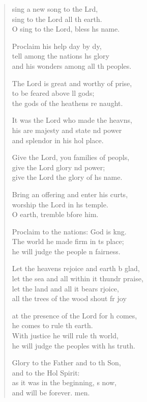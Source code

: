 \begin{verse}
  \begin{patverse}
 sing a new song to the Lrd,\Flex\\
sing to the Lord all th earth.\Med\\
O sing to the Lord, bless h\pointup{\i}s name.

Proclaim his help day by dy,\Flex\\
tell among the nations h\pointup{\i}s glory\Med\\
and his wonders among all th peoples.

The Lord is great and worthy of prise,\Flex\\
to be feared above ll gods;\Med\\
the gods of the heathens re naught.

It was the Lord who made the heavns,\Flex\\
his are majesty and state nd power\Med\\
and splendor in his hol place.

Give the Lord, you families of peopls,\Flex\\
give the Lord glory nd power;\Med\\
give the Lord the glory of h\pointup{\i}s name.

Bring an offering and enter his curts,\Flex\\
worship the Lord in h\pointup{\i}s temple.\Med\\
O earth, tremble bfore him.

Proclaim to the nations: God is k\pointup{\i}ng.\Flex\\
The world he made firm in \pointup{\i}ts place;\Med\\
he will judge the people \pointup{\i}n fairness.

Let the heavens rejoice and earth b glad,\Med\\
let the sea and all within it thundr praise,\\
let the land and all it bears rjoice,\Med\\
all the trees of the wood shout fr joy

at the presence of the Lord for h comes,\Med\\
he comes to rule th earth.\\
With justice he will rule th world,\Med\\
he will judge the peoples with h\pointup{\i}s truth.

Glory to the Father and to th Son,\Med\\
and to the Hol Spirit:\\
as it was in the beginning, \pointup{\i}s now,\Med\\
and will be forever. men. 
  \end{patverse}
\end{verse}
